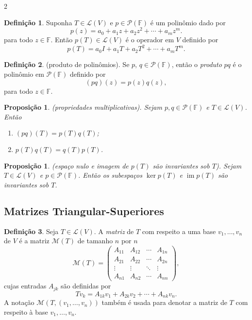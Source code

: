 \documentclass{article}
\theoremstyle{plain}
\newtheorem{prop}[thm]{Proposição}
\theoremstyle{definition}
\newtheorem{defn}{Definição}[section]
\theoremstyle{remark}
\DeclareMathOperator{\im}{im}
\begin{document}
\begin{multicols}{2}
\begin{defn}
    Suponha \(T \in \mathcal{L}(V)\) e \(p \in \mathcal{P}(\mathbb{F})\) é um polinômio dado por
    \[    p(z) = a_0 + a_1 z + a_2 z^2 + \cdots + a_m z^m.\]
    \noindent para todo \(z \in \mathbb{F}\). Então \(p(T) \in \mathcal{L}(V)\) é o operador em \(V\) definido por
    \[    p(T) = a_0 I + a_1 T + a_2 T^2 + \cdots + a_m T^m.\]
\end{defn}

\begin{defn} (produto de polinômios).
    Se \(p\), \(q \in \mathcal{P}(\mathbb{F})\), então o \emph{produto} \(pq\) é o polinômio em \(\mathcal{P}(\mathbb{F})\) definido por
    \[    (pq)(z) = p(z) q(z),\]
    \noindent para todo \(z \in \mathbb{F}\).
\end{defn}

\begin{prop} (propriedades multiplicativas).
    Sejam \(p, q \in \mathcal{P}(\mathbb{F})\) e \(T \in \mathcal{L}(V)\). Então
    \begin{enumerate}
        \item[(a)] \((pq)(T) = p(T) q(T)\);
        \item[(b)] \(p(T) q(T) = q(T) p(T)\).
    \end{enumerate}
\end{prop}

\begin{prop} (espaço nulo e imagem de \(p(T)\) são invariantes sob \(T\)).
    Sejam \(T \in \mathcal{L}(V)\) e \(p \in \mathcal{P}(\mathbb{F})\). Então os subespaços \(\ker p(T)\) e \(\im p(T)\) são invariantes sob \(T\).
\end{prop}

\subsection{Matrizes Triangular-Superiores}

\begin{defn}
    Seja \(T \in \mathcal{L}(V)\). A \emph{matriz} de \(T\) com respeito a uma base \(v_1, \ldots, v_n\) de \(V\) é a matriz \(\mathcal{M}(T)\) de tamanho \(n\) por \(n\)
    \[
    \mathcal{M}(T) = \begin{pmatrix}
        A_{11} & A_{12} & \cdots & A_{1n} \\
        A_{21} & A_{22} & \cdots & A_{2n} \\
        \vdots & \vdots & \ddots & \vdots \\
        A_{n1} & A_{n2} & \cdots & A_{nn}
    \end{pmatrix},
    \]
    \noindent cujas entradas \(A_{jk}\) são definidas por
    \[
        Tv_k = A_{1k} v_1 + A_{2k} v_2 + \cdots + A_{nk} v_n.
    \]
    A notação \(\mathcal{M}(T, (v_1, \ldots, v_n))\) também é usada para denotar a matriz de \(T\) com respeito à base \(v_1, \ldots, v_n\).
\end{defn}


\end{multicols}
\end{document}
